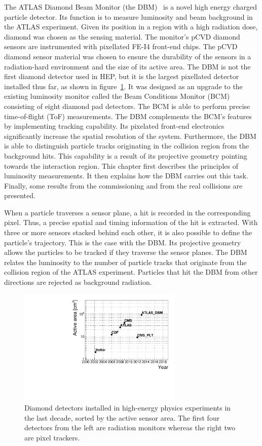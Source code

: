 The ATLAS Diamond Beam Monitor (the DBM)~\cite{} is a novel high energy charged particle detector. Its function is to measure luminosity and beam background in the ATLAS experiment. Given its position in a region with a high radiation dose, diamond was chosen as the sensing material. The monitor's pCVD diamond sensors are instrumented with pixellated FE-I4 front-end chips. The pCVD diamond sensor material was chosen to ensure the durability of the sensors in a radiation-hard environment and the size of its active area. The DBM is not the first diamond detector used in HEP, but it is the largest pixellated detector installed thus far, as shown in figure~\ref{fig:areavsyear}. It was designed as an upgrade to the existing luminosity monitor called the Beam Conditions Monitor (BCM)~\cite{} consisting of eight diamond pad detectors. The BCM is able to perform precise time-of-flight (ToF) measurements. The DBM complements the BCM's features by implementing tracking capability. Its pixelated front-end electronics significantly increase the spatial resolution of the system. Furthermore, the DBM is able to distinguish particle tracks originating in the collision region from the background hits. This capability is a result of its projective geometry pointing towards the interaction region. This chapter first describes the principles of luminosity measurements. It then explains how the DBM carries out this task. Finally, some results from the commissioning and from the real collisions are presented. 

When a particle traverses a sensor plane, a hit is recorded in the corresponding pixel. Thus, a precise spatial and timing information of the hit is extracted. With three or more sensors stacked behind each other, it is also possible to define the particle's trajectory. This is the case with the DBM. Its projective geometry allows the particles to be tracked if they traverse the sensor planes. The DBM relates the luminosity to the number of particle tracks that originate from the collision region of the ATLAS experiment. Particles that hit the DBM from other directions are rejected as background radiation.

\begin{figure}[!t]
\centering
\includegraphics[width=0.7\textwidth]{../scripts/04_charge_monitoring/plots/detArea}
\caption{Diamond detectors installed in high-energy physics experiments in the last decade, sorted by the active sensor area. The first four detectors from the left are radiation monitors whereas the right two are pixel trackers.}
\label{fig:areavsyear}
\end{figure}

